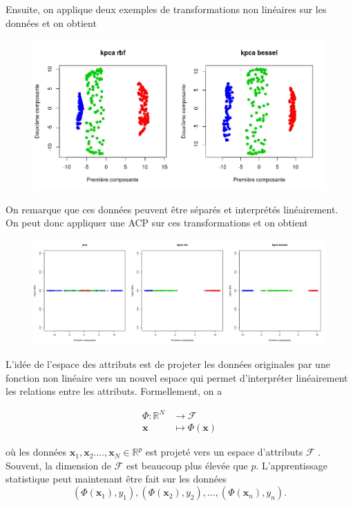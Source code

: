 Ensuite, on applique deux exemples de transformations non linéaires sur les données et on obtient 

\begin{figure}[H]
	\includegraphics[width=\textwidth]{sim-kernel}
\end{figure}

On remarque que ces données peuvent être séparés et interprétés linéairement. On peut donc appliquer une ACP sur ces transformations et on obtient 

\begin{figure}[H]
	\includegraphics[width=\textwidth]{sim-1pc}
\end{figure}

L'idée de l'espace des attributs est de projeter les données originales par une fonction non linéaire vers un nouvel espace qui permet d'interpréter linéairement les relations entre les attributs. Formellement, on a 

\begin{align}\label{eq:featurespace}
\Phi : \mathbb{R}^N &\to \mathcal{F} \nonumber \\
\textbf{x} &\mapsto \Phi(\textbf{x}) 
\end{align}

où les données $\textbf{x}_1, \textbf{x}_2. \dots, \textbf{x}_N \in \mathbb{R}^p$ est projeté vers un espace d'attributs $\mathcal{F}$ \cite{muller2001introduction}. Souvent, la dimension de $\mathcal{F}$ est beaucoup plus élevée que $p$. L'apprentissage statistique peut maintenant être fait sur les données $$(\Phi(\textbf{x}_1), y_1), (\Phi(\textbf{x}_2), y_2), \dots, (\Phi(\textbf{x}_n), y_n).$$

